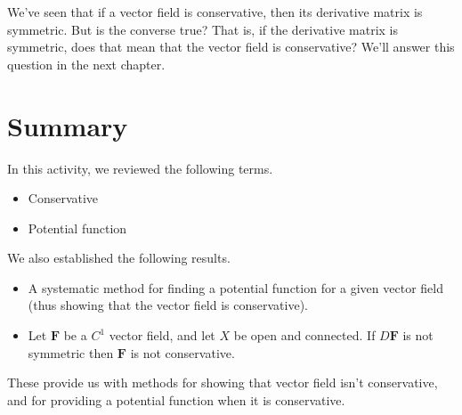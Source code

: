 \documentclass{ximera}
\begin{document}
We've seen that if a vector field is conservative, then its derivative matrix is symmetric. But is the converse true? That is, if the derivative matrix is symmetric, does that mean that the vector field is conservative? We'll answer this question in the next chapter.

\section*{Summary}

In this activity, we reviewed the following terms.
\begin{itemize}
\item Conservative
\item Potential function
\end{itemize}

We also established the following results.
\begin{itemize}
\item A systematic method for finding a potential function for a given vector field (thus showing that the vector field is conservative).
\item Let $\mathbf{F}$ be a $C^1$ vector field, and let $X$ be open and connected. If $D\mathbf{F}$ is not symmetric then $\mathbf{F}$ is not conservative.
\end{itemize}

These provide us with methods for showing that vector field isn't conservative, and for providing a potential function when it is conservative.
\end{document}
